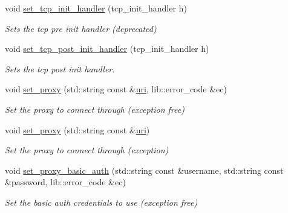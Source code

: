 \begin{DoxyCompactItemize}
void \mbox{\hyperlink{classwebsocketpp_1_1transport_1_1asio_1_1connection_abb0254e3207691c45c9ca7061352a90a}{set\+\_\+tcp\+\_\+init\+\_\+handler}} (tcp\+\_\+init\+\_\+handler h)
\begin{DoxyCompactList}\small\item\em Sets the tcp pre init handler (deprecated) \end{DoxyCompactList}\item 
void \mbox{\hyperlink{classwebsocketpp_1_1transport_1_1asio_1_1connection_a069b63faee90061ed4fa4e66d221ac18}{set\+\_\+tcp\+\_\+post\+\_\+init\+\_\+handler}} (tcp\+\_\+init\+\_\+handler h)
\begin{DoxyCompactList}\small\item\em Sets the tcp post init handler. \end{DoxyCompactList}\item 
void \mbox{\hyperlink{classwebsocketpp_1_1transport_1_1asio_1_1connection_a9638063c7c8c90c74d97008dacd81095}{set\+\_\+proxy}} (std\+::string const \&\mbox{\hyperlink{classwebsocketpp_1_1uri}{uri}}, lib\+::error\+\_\+code \&ec)
\begin{DoxyCompactList}\small\item\em Set the proxy to connect through (exception free) \end{DoxyCompactList}\item 
\mbox{\label{classwebsocketpp_1_1transport_1_1asio_1_1connection_a8bd4c1b8ffbe04230249567e3217acfb}} 
void \mbox{\hyperlink{classwebsocketpp_1_1transport_1_1asio_1_1connection_a8bd4c1b8ffbe04230249567e3217acfb}{set\+\_\+proxy}} (std\+::string const \&\mbox{\hyperlink{classwebsocketpp_1_1uri}{uri}})
\begin{DoxyCompactList}\small\item\em Set the proxy to connect through (exception) \end{DoxyCompactList}\item 
void \mbox{\hyperlink{classwebsocketpp_1_1transport_1_1asio_1_1connection_a99ee9d4f4043a2e3b2225cb1f03a56d1}{set\+\_\+proxy\+\_\+basic\+\_\+auth}} (std\+::string const \&username, std\+::string const \&password, lib\+::error\+\_\+code \&ec)
\begin{DoxyCompactList}\small\item\em Set the basic auth credentials to use (exception free) \end{DoxyCompactList}\item 
\mbox{\label{classwebsocketpp_1_1transport_1_1asio_1_1connection_a0a42cbcc12974d71c0ea91d12da6b72e}} 

\end{DoxyCompactItemize}
